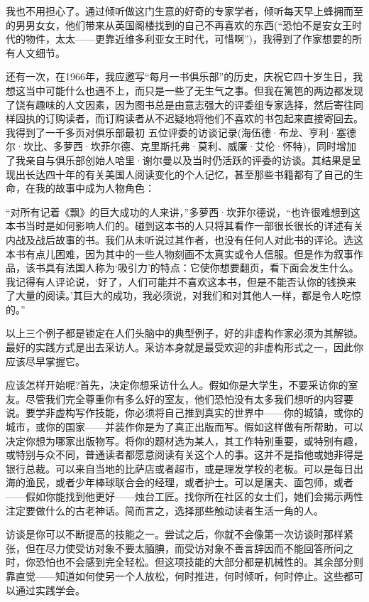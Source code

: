 我也不用担心了。通过倾听做这门生意的好奇的专家学者，倾听每天早上蜂拥而至的男男女女，他们带来从英国阁楼找到的自己不再喜欢的东西(“恐怕不是安女王时代的物件，太太——更靠近维多利亚女王时代，可惜啊”)，我得到了作家想要的所有人文细节。

还有一次，在1966年，我应邀写“每月一书俱乐部”的历史，庆祝它四十岁生日，我想这当中可能什么也遇不上，而只是一些了无生气之事。但我在篱笆的两边都发现了饶有趣味的人文因素，因为图书总是由意志强大的评委组专家选择，然后寄往同样固执的订购读者，而订购读者从不迟疑地将他们不喜欢的书包起来直接寄回去。我得到了一千多页对俱乐部最初 五位评委的访谈记录(海伍德·布龙、亨利·塞德尔·坎比、多萝西·坎菲尔德、克里斯托弗·莫利、威廉·艾伦·怀特)，同时增加了我亲自与俱乐部创始人哈里·谢尔曼以及当时仍活跃的评委的访谈。其结果是呈现出长达四十年的有关美国人阅读变化的个人记忆，甚至那些书籍都有了自己的生命，在我的故事中成为人物角色：

“对所有记着《飘》的巨大成功的人来讲，”多萝西·坎菲尔德说，“也许很难想到这本书当时是如何影响人们的。碰到这本书的人只将其看作一部很长很长的详述有关内战及战后故事的书。我们从未听说过其作者，也没有任何人对此书的评论。选这本书有点儿困难，因为其中的一些人物刻画不太真实或令人信服。但是作为叙事作品，该书具有法国人称为‘吸引力’的特点：它使你想要翻页，看下面会发生什么。我记得有人评论说，‘好了，人们可能并不喜欢这本书，但是不能否认你的钱换来了大量的阅读。’其巨大的成功，我必须说，对我们和对其他人一样，都是令人吃惊的。”

以上三个例子都是锁定在人们头脑中的典型例子，好的非虚构作家必须为其解锁。最好的实践方式是出去采访人。采访本身就是最受欢迎的非虚构形式之一，因此你应该尽早掌握它。

应该怎样开始呢?首先，决定你想采访什么人。假如你是大学生，不要采访你的室友。尽管我们完全尊重你有多么好的室友，他们恐怕没有太多我们想听的内容要说。要学非虚构写作技能，你必须将自己推到真实的世界中——你的城镇，或你的城市，或你的国家——并装作你是为了真正出版而写。假如这样做有所帮助，可以决定你想为哪家出版物写。将你的题材选为某人，其工作特别重要，或特别有趣，或特别与众不同，普通读者都愿意阅读有关这个人的事。这并不是指他或她非得是银行总裁。可以来自当地的比萨店或者超市，或是理发学校的老板。可以是每日出海的渔民，或者少年棒球联合会的经理，或者护士。可以是屠夫、面包师，或者——假如你能找到他更好——烛台工匠。找你所在社区的女士们，她们会揭示两性注定要做什么的古老神话。简而言之，选择那些触动读者生活一角的人。

访谈是你可以不断提高的技能之一。尝试之后，你就不会像第一次访谈时那样紧张，但在尽力使受访对象不要太腼腆，而受访对象不善言辞因而不能回答所问之时，你恐怕也不会感到完全轻松。但这项技能的大部分都是机械性的。其余部分则靠直觉——知道如何使另一个人放松，何时推进，何时倾听，何时停止。这些都可以通过实践学会。

